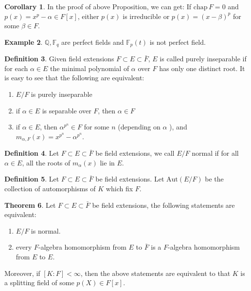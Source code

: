 \documentclass[a4paper,12pt]{article}
\newcommand{\bb}[1]{\mathbb{#1}}
\theoremstyle{definition}
\newtheorem{defn}{Definition}[subsection]
\newtheorem{coro}[defn]{Corollary}
\newtheorem{theo}[defn]{Theorem}
\newtheorem{exam}[defn]{Example}
\begin{document}
\begin{coro}
    In the proof of above Proposition, we can get: If $\text{chap}\, F=0$ and $p(x)=x^p-\alpha\in F[x]$, either $p(x)$ is irreducible or $p(x)=(x-\beta)^p$ for some $\beta\in F$.
\end{coro}
\begin{exam}
    $\bb{Q},\bb{F}_q$ are perfect fields and $\bb{F}_p(t)$ is not perfect field.
\end{exam}
\begin{defn}
    Given field extensions $F\subset E\subset \bar{F}$, $E$ is called purely inseparable if for each $\alpha \in E$ the minimal polynomial of $\alpha$ over $F$ has only one distinct root.
    It is easy to see that the following are equivalent:
    \begin{enumerate}[(1)]
        \item $E / F$ is purely inseparable
        \item if $\alpha \in E$ is separable over $F$, then $\alpha \in F$
        \item if $\alpha \in E$, then $\alpha^{p^n} \in F$ for some $n$ (depending on $\alpha$ ), and $m_{\alpha, F}(x)=x^{p^n}-\alpha^{p^n}$.
    \end{enumerate}
    \label{Definition:characterizations of purely inseparable}
\end{defn}
\begin{defn}
    Let $F\subset E\subset \bar{F}$ be field extensions, we call $E/F$ normal if for all $\alpha\in E$, all the roots of $m_{\alpha}(x)$ lie in $E$.
\end{defn}
\begin{defn}
    Let $F\subset E\subset \bar{F}$ be field extensions. Let $\text{Aut}(E/F)$ be the collection of
    automorphisms of $K$ which fix $F$.
\end{defn}
\begin{theo}
    Let $F\subset E\subset \bar{F}$ be field extensions, the following statements are equivalent:
    \begin{enumerate}[(1)]
        \item $E/F$ is normal.
        \item every $F$-algebra homomorphism from $E$ to $\bar{F}$ is a $F$-algebra homomorphism from $E$ to $E$.
    \end{enumerate}
    Moreover, if $[K: F]<\infty$, then the above statements are equivalent to that $K$ is a splitting field of some $p(X) \in F[x]$.
    \label{theorem:characterizations of normal extension}
\end{theo}
\end{document}

